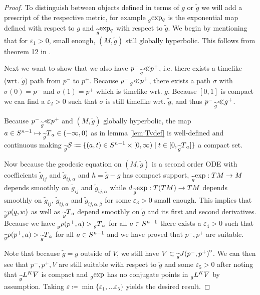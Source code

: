 \begin{proof}
    To distinguish between objects defined in terms of $g$ or $\widetilde{g}$ we will add a prescript of the respective metric, for example $\prescript{}{g}{\exp}_q$ is the exponential map defined with respect to $g$ and $\prescript{}{\widetilde{g}}{\exp}_q$ with respect to $\widetilde{g}$. We begin by mentioning that for $\varepsilon_1>0$, small enough, $(M,\widetilde{g})$ still globally hyperbolic. This follows from theorem 12 in \cite{gerochdomain}.
    
    Next we want to show that we also have $p^- \prescript{}{\widetilde{g}}{\ll} p^+$, i.e. there exists a timelike (wrt. $\widetilde{g}$) path from 
    $p^-$ to $p^+$. Because $p^- \prescript{}{g}{\ll} p^+$, there exists a path $\sigma$ with $\sigma(0)=p^-$ and $\sigma(1)=p^+$ which is timelike wrt. $g$. Because $[0,1]$ is compact we can find a $\varepsilon_2>0$ such that $\sigma$ is still timelike wrt. $\widetilde{g}$, and thus $p^-\prescript{}{\widetilde{g}}{\ll} g^+$.

    Because $p^-\prescript{}{\widetilde{g}}{\ll} p^+$ and $(M,\widetilde{g})$ globally hyperbolic, the map $a\in {S^{n-1}} \mapsto \prescript{}{\widetilde{g}}{T}_a\in (-\infty,0)$ as in lemma \ref{lem:Tvdef} is well-defined and continuous making $\prescript{}{\widetilde{g}}{{\mathcal{S}}} \coloneqq  \{(a,t)\in {S^{n-1}}\times [0,\infty) \mid t\in [0,\prescript{}{\widetilde{g}}{T}_a]\}$ a compact set. 

    Now because the geodesic equation on $(M,\widetilde{g})$ is a second order ODE with coefficients $\widetilde{g}_{ij}$ and $\widetilde{g}_{ij,\alpha}$ and $h=\widetilde{g}-g$ has compact support, $\prescript{}{\widetilde{g}}{\exp}:TM\to M$ depends smoothly on $\widetilde{g}_{ij}$ and $\widetilde{g}_{ij,\alpha}$ while $d\prescript{}{\widetilde{g}}{\exp}:T(TM)\to TM$ depends smoothly on $\widetilde{g}_{ij}$, $\widetilde{g}_{ij,\alpha}$ and $\widetilde{g}_{ij,\alpha,\beta}$ for some $\varepsilon_3>0$ small enough. This implies that $\prescript{}{\widetilde{g}}{\rho(q,w)}$ as well as $\prescript{}{\widetilde{g}}{T}_a$ depend smoothly on $\widetilde{g}$ and its first and second derivatives. Because we have $\prescript{}{g}{\rho(p^+,a)}>\prescript{}{g}{T}_a$ for all $a\in {S^{n-1}}$ there exists a $\varepsilon_4>0$ such that $\prescript{}{\widetilde{g}}{\rho(p^+,a)}>\prescript{}{\widetilde{g}}{T}_a$ for all $a\in {S^{n-1}}$ and we have proved that $p^-,p^+$ are suitable.

    Note that because $\widetilde{g}=g$ outside of $V$, we still have $V\subset {\kern0pt\prescript{}{\widetilde{g}}{J(p^-,p^+)}}^{\mathrm{o}}$. We can then see that $p^-,p^+,V$ are still suitable with respect to $\widetilde{g}$ and some $\varepsilon_5>0$ after noting that $\prescript{}{\widetilde{g}}{L}^K{\overline{V}}$ is compact and $\prescript{}{g}{\exp}$ has no conjugate points in $\prescript{}{g}{L}^K{\overline{V}}$ by assumption. Taking $\varepsilon\coloneqq \min \{\varepsilon_1,\dots \varepsilon_5\}$ yields the desired result.
\end{proof}

